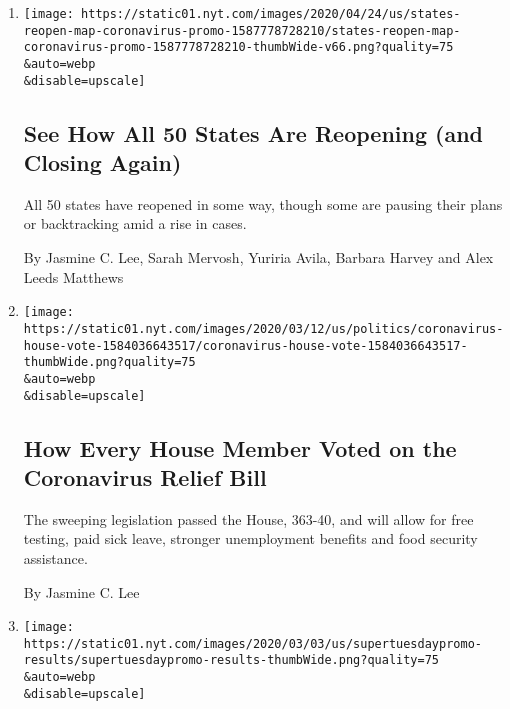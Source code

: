 \begin{enumerate}
\def\labelenumi{\arabic{enumi}.}
\item
  \href{/interactive/2020/us/states-reopen-map-coronavirus.html}{}

  \texttt{[image: https://static01.nyt.com/images/2020/04/24/us/states-reopen-map-coronavirus-promo-1587778728210/states-reopen-map-coronavirus-promo-1587778728210-thumbWide-v66.png?quality=75\\\&auto=webp\\\&disable=upscale]}

  \hypertarget{see-how-all-50-states-are-reopening-and-closing-again}{%
  \subsection{See How All 50 States Are Reopening (and Closing
  Again)}\label{see-how-all-50-states-are-reopening-and-closing-again}}

  All 50 states have reopened in some way, though some are pausing their
  plans or backtracking amid a rise in cases.

  By Jasmine C. Lee, Sarah Mervosh, Yuriria Avila, Barbara Harvey and
  Alex Leeds Matthews
\item
  \href{/interactive/2020/03/14/us/politics/coronavirus-house-vote.html}{}

  \texttt{[image: https://static01.nyt.com/images/2020/03/12/us/politics/coronavirus-house-vote-1584036643517/coronavirus-house-vote-1584036643517-thumbWide.png?quality=75\\\&auto=webp\\\&disable=upscale]}

  \hypertarget{how-every-house-member-voted-on-the-coronavirus-relief-bill}{%
  \subsection{How Every House Member Voted on the Coronavirus Relief
  Bill}\label{how-every-house-member-voted-on-the-coronavirus-relief-bill}}

  The sweeping legislation passed the House, 363-40, and will allow for
  free testing, paid sick leave, stronger unemployment benefits and food
  security assistance.

  By Jasmine C. Lee
\item
  \href{/interactive/2020/03/03/us/elections/results-super-tuesday-primary-election.html}{}

  \texttt{[image: https://static01.nyt.com/images/2020/03/03/us/supertuesdaypromo-results/supertuesdaypromo-results-thumbWide.png?quality=75\\\&auto=webp\\\&disable=upscale]}


\end{enumerate}
